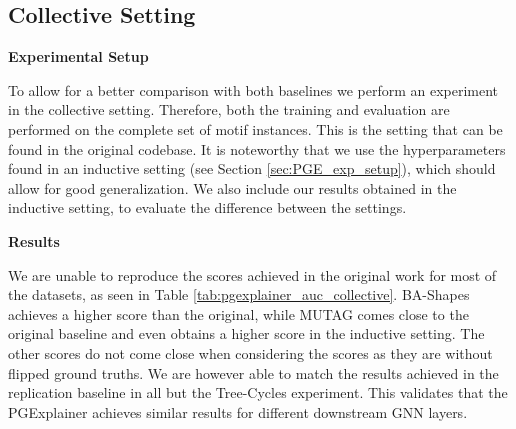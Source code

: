 

\subsection{Collective Setting}
\label{sec:coll_exp}

\textbf{Experimental Setup} \par
To allow for a better comparison with both baselines we perform an experiment in the collective setting. Therefore, both the training and evaluation are performed on the complete set of motif instances. This is the setting that can be found in the original codebase. It is noteworthy that we use the hyperparameters found in an inductive setting (see Section \ref{sec:PGE_exp_setup}), which should allow for good generalization. We also include our results obtained in the inductive setting, to evaluate the difference between the settings. \bigskip

\textbf{Results}\par

We are unable to reproduce the scores achieved in the original work for most of the datasets, as seen in Table \ref{tab:pgexplainer_auc_collective}. BA-Shapes achieves a higher score than the original, while MUTAG comes close to the original baseline and even obtains a higher score in the inductive setting. The other scores do not come close when considering the scores as they are without flipped ground truths. We are however able to match the results achieved in the replication baseline in all but the Tree-Cycles experiment. This validates that the PGExplainer achieves similar results for different downstream GNN layers.

